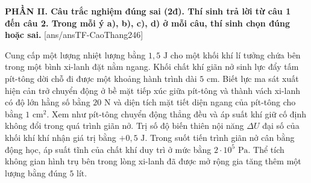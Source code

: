 
\noindent \textbf{PHẦN II. Câu trắc nghiệm đúng sai (2đ). Thí sinh trả lời từ câu 1 đến câu 2. Trong mỗi ý a), b), c), d) ở mỗi câu, thí sinh chọn đúng hoặc sai.}
[ans/ansTF-CaoThang246]

\begin{ex}%
	Cung cấp một lượng nhiệt lượng bằng $1,5\text{ J}$ cho một khối khí lí tưởng chứa bên trong một bình xi-lanh đặt nằm ngang. Khối chất khí giãn nở sinh lực đẩy tấm pít-tông dời chỗ đi được một khoảng hành trình dài $5\text{ cm}$. Biết lực ma sát xuất hiện cản trở chuyển động ở bề mặt tiếp xúc giữa pít-tông và thành vách xi-lanh có độ lớn hằng số bằng $20\text{ N}$ và diện tích mặt tiết diện ngang của pít-tông cho bằng $1\text{ cm}^2$. Xem như pít-tông chuyển động thẳng đều và áp suất khí giữ cố định không đổi trong quá trình giãn nở.
	{\True Trị số độ biến thiên nội năng $\Delta U$ đại số của khối khí khí nhận giá trị bằng $+0,5\text{ J}$.}
	{\True Trong suốt tiến trình giãn nở cân bằng động học, áp suất tĩnh của chất khí duy trì ở mức bằng $2 \cdot 10^5\text{ Pa}$.}
	{Thể tích không gian hình trụ bên trong lòng xi-lanh đã được mở rộng gia tăng thêm một lượng bằng đúng $5\text{ lít}$.}
\end{ex}

